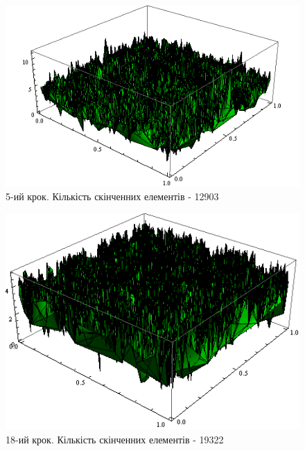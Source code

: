 \begin{figure}[H]
	\centering
    \includegraphics[scale=0.85]{problem1/my/AEE/5}
    \caption{5-ий крок. Кількість скінченних елементів - 12903}
    \label{fig:p1_aee5}
\end{figure}

\begin{figure}[H]
	\centering
    \includegraphics[scale=0.85]{problem1/my/AEE/18}
    \caption{18-ий крок. Кількість скінченних елементів - 19322}
    \label{fig:p1_aee18}
\end{figure}

